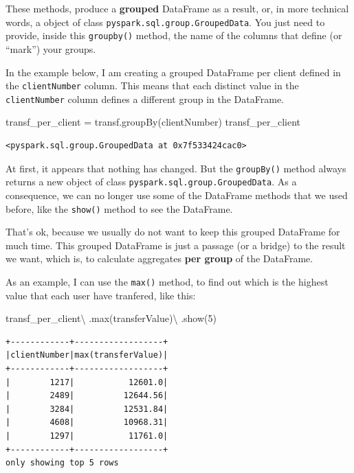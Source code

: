 \documentclass[
  11pt,
  letterpaper,
  DIV=11,
  numbers=noendperiod]{scrreprt}
\newenvironment{Shaded}{\begin{snugshade}}{\end{snugshade}}
\newcommand{\BuiltInTok}[1]{\textcolor[rgb]{0.00,0.23,0.31}{#1}}
\newcommand{\DecValTok}[1]{\textcolor[rgb]{0.68,0.00,0.00}{#1}}
\newcommand{\NormalTok}[1]{\textcolor[rgb]{0.00,0.23,0.31}{#1}}
\newcommand{\OperatorTok}[1]{\textcolor[rgb]{0.37,0.37,0.37}{#1}}
\newcommand{\StringTok}[1]{\textcolor[rgb]{0.13,0.47,0.30}{#1}}
\begin{document}
These methods, produce a \textbf{grouped} DataFrame as a result, or, in
more technical words, a object of class
\texttt{pyspark.sql.group.GroupedData}. You just need to provide, inside
this \texttt{groupby()} method, the name of the columns that define (or
``mark'') your groups.

In the example below, I am creating a grouped DataFrame per client
defined in the \texttt{clientNumber} column. This means that each
distinct value in the \texttt{clientNumber} column defines a different
group in the DataFrame.

\begin{Shaded}
\begin{Highlighting}[]
\NormalTok{transf\_per\_client }\OperatorTok{=}\NormalTok{ transf.groupBy(}\StringTok{\textquotesingle{}clientNumber\textquotesingle{}}\NormalTok{)}
\NormalTok{transf\_per\_client}
\end{Highlighting}
\end{Shaded}

\begin{verbatim}
<pyspark.sql.group.GroupedData at 0x7f533424cac0>
\end{verbatim}

At first, it appears that nothing has changed. But the
\texttt{groupBy()} method always returns a new object of class
\texttt{pyspark.sql.group.GroupedData}. As a consequence, we can no
longer use some of the DataFrame methods that we used before, like the
\texttt{show()} method to see the DataFrame.

That's ok, because we usually do not want to keep this grouped DataFrame
for much time. This grouped DataFrame is just a passage (or a bridge) to
the result we want, which is, to calculate aggregates \textbf{per group}
of the DataFrame.

As an example, I can use the \texttt{max()} method, to find out which is
the highest value that each user have tranfered, like this:

\begin{Shaded}
\begin{Highlighting}[]
\NormalTok{transf\_per\_client}\OperatorTok{\textbackslash{}}
\NormalTok{  .}\BuiltInTok{max}\NormalTok{(}\StringTok{\textquotesingle{}transferValue\textquotesingle{}}\NormalTok{)}\OperatorTok{\textbackslash{}}
\NormalTok{  .show(}\DecValTok{5}\NormalTok{)}
\end{Highlighting}
\end{Shaded}

\begin{verbatim}
+------------+------------------+
|clientNumber|max(transferValue)|
+------------+------------------+
|        1217|           12601.0|
|        2489|          12644.56|
|        3284|          12531.84|
|        4608|          10968.31|
|        1297|           11761.0|
+------------+------------------+
only showing top 5 rows
\end{verbatim}
\end{document}
